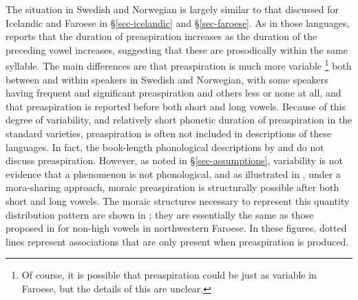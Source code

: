 \documentclass[output=paper,colorlinks,citecolor=brown]{langscibook}
\begin{document}
The situation in Swedish and Norwegian is largely similar to that discussed for Icelandic and Faroese in \S\ref{sec-icelandic} and \S\ref{sec-faroese}. As in those languages, \citet{Helgason2002} reports that the duration of preaspiration increases as the duration of the preceding vowel increases, suggesting that these are prosodically within the same syllable. The main differences are that preaspiration is much more variable%
\footnote{Of course, it is possible that preaspiration could be just as variable in Faroese, but the details of this are unclear.}
both between and within speakers in Swedish and Norwegian, with some speakers having frequent and significant preaspiration and others less or none at all, and that preaspiration is reported before both short and long vowels. Because of this degree of variability, and relatively short phonetic duration of preaspiration in the standard varieties, preaspiration is often not included in descriptions of these languages. In fact, the book-length phonological descriptions by \citet{riad2014} and \citet{kristoffersen2000} do not discuss preaspiration. However, as noted in \S\ref{sec-assumptions}, variability is not evidence that a phenomenon is not phonological, and as illustrated in , under a mora-sharing approach, moraic preaspiration is structurally possible after both short and long vowels. The moraic structures necessary to represent this quantity distribution pattern are shown in ; they are essentially the same as those proposed in  for non-high vowels in northwestern Faroese. 
In these figures, dotted lines represent associations that are only present when preaspiration is produced.
\end{document}
